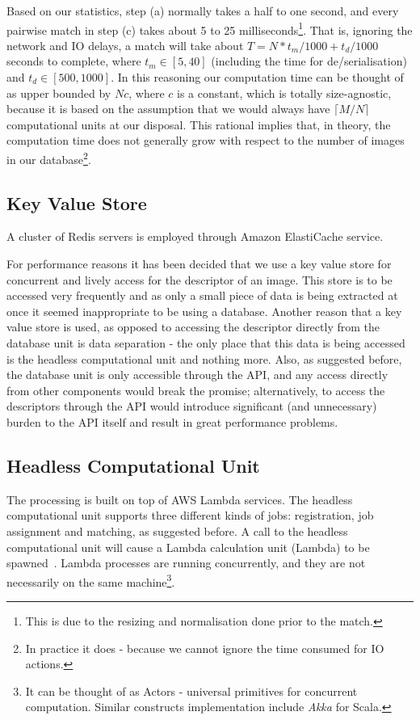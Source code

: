 Based on our statistics, step (a) normally takes a half to one second, and every pairwise match in step (c) takes about 5 to 25 milliseconds\footnote{This is due to the resizing and normalisation done prior to the match.}. That is, ignoring the network and IO delays, a match will take about $T = N * t_m / 1000 + t_d / 1000$ seconds to complete, where $t_m \in [5, 40]$ (including the time for de/serialisation) and $t_d \in [500, 1000]$. In this reasoning our computation time can be thought of as upper bounded by $Nc$, where $c$ is a constant, which is totally size-agnostic, because it is based on the assumption that we would always have $\lceil M / N \rceil$ computational units at our disposal. This rational implies that, in theory, the computation time does not generally grow with respect to the number of images in our database\footnote{In practice it does - because we cannot ignore the time consumed for IO actions.}.

\subsection{Key Value Store}
A cluster of Redis servers is employed through Amazon ElastiCache service. 

For performance reasons it has been decided that we use a key value store for concurrent and lively access for the descriptor of an image. This store is to be accessed very frequently and as only a small piece of data is being extracted at once it seemed inappropriate to be using a database. Another reason that a key value store is used, as opposed to accessing the descriptor directly from the database unit is data separation - the only place that this data is being accessed is the headless computational unit and nothing more. Also, as suggested before, the database unit is only accessible through the API, and any access directly from other components would break the promise; alternatively, to access the descriptors through the API would introduce significant (and unnecessary) burden to the API itself and result in great performance problems.

\subsection{Headless Computational Unit}
\label{sec:lambda}
The processing is built on top of AWS Lambda services. The headless computational unit supports three different kinds of jobs: registration, job assignment and matching, as suggested before. A call to the headless computational unit will cause a Lambda calculation unit (Lambda) to be spawned~\cite{lambda}. Lambda processes are running concurrently, and they are not necessarily on the same machine\footnote{It can be thought of as Actors - universal primitives for concurrent computation. Similar constructs implementation include \textit{Akka} for Scala.}.

